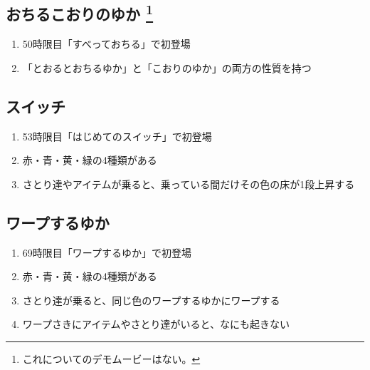 \subsection[おちるこおりのゆか]{おちるこおりのゆか%
\footnote{これについてのデモムービーはない。}%
}
\begin{enumerate}[label={\sarrow}]
\item 50時限目「すべっておちる」で初登場
\item 「とおるとおちるゆか」と「こおりのゆか」の両方の性質を持つ
\end{enumerate}


\subsection{スイッチ}
\begin{enumerate}[label={\sarrow}]
\item 53時限目「はじめてのスイッチ」で初登場
\item 赤・青・黄・緑の4種類がある
\item さとり達やアイテムが乗ると、乗っている間だけその色の床が1段上昇する
\end{enumerate}


\subsection{ワープするゆか}
\begin{enumerate}[label={\sarrow}]
\item 69時限目「ワープするゆか」で初登場
\item 赤・青・黄・緑の4種類がある
\item さとり達が乗ると、同じ色のワープするゆかにワープする
\item ワープさきにアイテムやさとり達がいると、なにも起きない
\end{enumerate}



\clearpage


